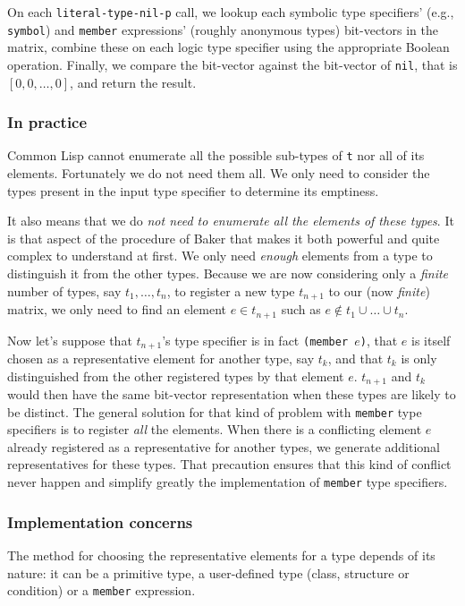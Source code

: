 \documentclass[format=sigconf]{acmart}
\newcommand\code[2][\small]{\sloppy\texttt{#1#2}}
\theoremstyle{definition}
\begin{document}
On each \code{literal-type-nil-p} call, we lookup each symbolic type
specifiers' (e.g., \code{symbol}) and \code{member} expressions' (roughly
anonymous types) bit-vectors in the matrix, combine these
on each logic type specifier using the appropriate Boolean operation. Finally,
we compare the bit-vector against the bit-vector of \code{nil}, that is
$\left[0, 0, \dots, 0\right]$, and return the result.

\subsubsection{In practice}
Common Lisp cannot enumerate all the possible sub-types of \code{t} nor all of
its elements. Fortunately we do not need them all. We only need to consider the
types present in the input type specifier to determine its emptiness.

It also means that we do \emph{not need to enumerate all the elements of these
  types}. It is that aspect of the procedure of Baker that makes it both
powerful and quite complex to understand at first. We only need \emph{enough}
elements from a type to distinguish it from the other types. Because we are
now considering only a \emph{finite} number of types, say $t_1, \dots, t_n$, to
register a new type $t_{n+1}$ to our (now \emph{finite}) matrix, we only need to
find an element $e \in t_{n+1}$ such as $e \notin t_1 \cup \dots \cup t_n$.

Now let's suppose that $t_{n+1}$'s type specifier is in fact \code{(member
  $e$)}, that $e$ is itself chosen as a representative element for another type,
say $t_k$, and that $t_k$ is only distinguished from the other registered types
by that element $e$. $t_{n+1}$ and $t_k$ would then have the same bit-vector
representation when these types are likely to be distinct. The general solution
for that kind of problem with \code{member} type specifiers is to register
\emph{all} the elements. When there is a conflicting element $e$ already
registered as a representative for another types, we generate additional
representatives for these types. That precaution ensures that this kind of
conflict never happen and simplify greatly the implementation of \code{member}
type specifiers.

\subsubsection{Implementation concerns}
The method for choosing the representative elements for a type depends of its
nature: it can be a primitive type, a user-defined type (class, structure or
condition) or a \code{member} expression.
\end{document}

